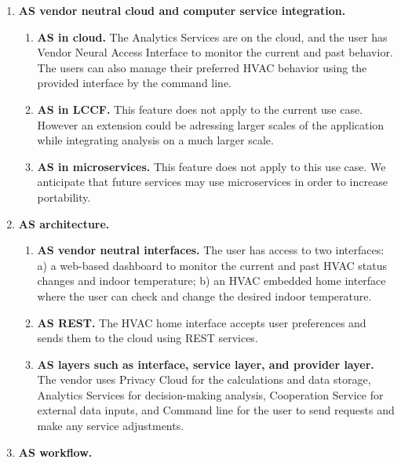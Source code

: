 \begin{enumerate}

\item{\bf AS vendor neutral cloud and computer service integration.} 

\begin{enumerate}
  \item {\bf AS in cloud.} The Analytics Services are on the cloud, and the user has Vendor Neural Access Interface to monitor the current and past behavior. The users can also manage their preferred HVAC behavior using the provided interface by the command line.
  \item {\bf AS in LCCF.} This feature does not apply to the current use case. However an extension could be adressing larger scales of the application while integrating analysis on a much larger scale.
  \item {\bf AS in microservices.} This feature does not apply to this use case. We anticipate that future services may use microservices in order to increase portability.
\end{enumerate}

\item{\bf AS architecture.} 

\begin{enumerate}
  \item{\bf AS vendor neutral interfaces.} The user has access to two interfaces: a) a web-based dashboard to monitor the current and past HVAC status changes and indoor temperature; b) an HVAC embedded home interface where the user can check and change the desired indoor temperature.
  \item{\bf AS REST.} The HVAC home interface accepts user preferences and sends them to the cloud using REST services. 
  \item{\bf AS layers such as interface, service layer, and provider layer.} The vendor uses Privacy Cloud for the calculations and data storage, Analytics Services for decision-making analysis, Cooperation Service for external data inputs, and Command line for the user to send requests and make any service adjustments.
\end{enumerate}

\item{\bf AS workflow.} 


\end{enumerate}
